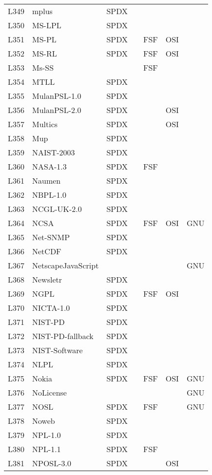 \begin{longtable}[h]{m{2cm} | m{7cm} | c | c | c | c | c}
L349 & mplus & SPDX &  &  &  &  \\
L350 & MS-LPL & SPDX &  &  &  &  \\
L351 & MS-PL & SPDX &  & FSF & OSI &  \\
L352 & MS-RL & SPDX &  & FSF & OSI &  \\
L353 & Ms-SS &  &  & FSF &  &  \\
L354 & MTLL & SPDX &  &  &  &  \\
L355 & MulanPSL-1.0 & SPDX &  &  &  &  \\
L356 & MulanPSL-2.0 & SPDX &  &  & OSI &  \\
L357 & Multics & SPDX &  &  & OSI &  \\
L358 & Mup & SPDX &  &  &  &  \\
L359 & NAIST-2003 & SPDX &  &  &  &  \\
L360 & NASA-1.3 & SPDX &  & FSF &  &  \\
L361 & Naumen & SPDX &  &  &  &  \\
L362 & NBPL-1.0 & SPDX &  &  &  &  \\
L363 & NCGL-UK-2.0 & SPDX &  &  &  &  \\
L364 & NCSA & SPDX &  & FSF & OSI & GNU \\
L365 & Net-SNMP & SPDX &  &  &  &  \\
L366 & NetCDF & SPDX &  &  &  &  \\
L367 & NetscapeJavaScript &  &  &  &  & GNU \\
L368 & Newsletr & SPDX &  &  &  &  \\
L369 & NGPL & SPDX &  & FSF & OSI &  \\
L370 & NICTA-1.0 & SPDX &  &  &  &  \\
L371 & NIST-PD & SPDX &  &  &  &  \\
L372 & NIST-PD-fallback & SPDX &  &  &  &  \\
L373 & NIST-Software & SPDX &  &  &  &  \\
L374 & NLPL & SPDX &  &  &  &  \\
L375 & Nokia & SPDX &  & FSF & OSI & GNU \\
L376 & NoLicense &  &  &  &  & GNU \\
L377 & NOSL & SPDX &  & FSF &  & GNU \\
L378 & Noweb & SPDX &  &  &  &  \\
L379 & NPL-1.0 & SPDX &  &  &  &  \\
L380 & NPL-1.1 & SPDX &  & FSF &  &  \\
L381 & NPOSL-3.0 & SPDX &  &  & OSI &  \\

\end{longtable}
